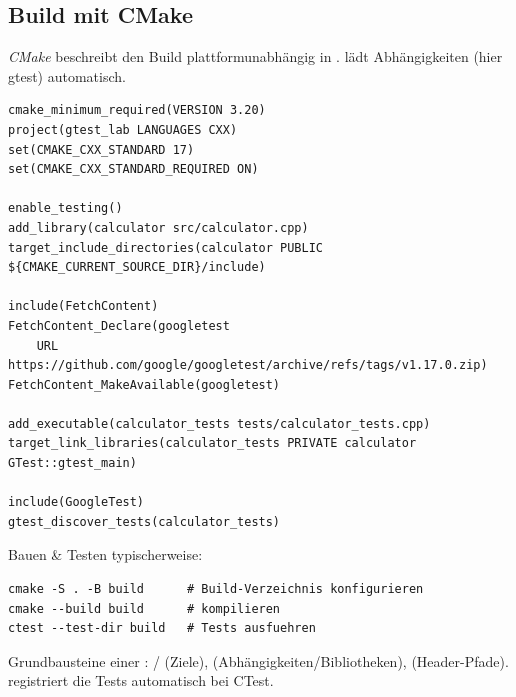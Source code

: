 \subsection{Build mit CMake}
\emph{CMake} beschreibt den Build plattformunabh\"angig in .  l\"adt Abh\"angigkeiten (hier gtest) automatisch.
\begin{lstlisting}[language={},morekeywords={}]
cmake_minimum_required(VERSION 3.20)
project(gtest_lab LANGUAGES CXX)
set(CMAKE_CXX_STANDARD 17)
set(CMAKE_CXX_STANDARD_REQUIRED ON)

enable_testing()
add_library(calculator src/calculator.cpp)
target_include_directories(calculator PUBLIC ${CMAKE_CURRENT_SOURCE_DIR}/include)

include(FetchContent)
FetchContent_Declare(googletest
    URL https://github.com/google/googletest/archive/refs/tags/v1.17.0.zip)
FetchContent_MakeAvailable(googletest)

add_executable(calculator_tests tests/calculator_tests.cpp)
target_link_libraries(calculator_tests PRIVATE calculator GTest::gtest_main)

include(GoogleTest)
gtest_discover_tests(calculator_tests)
\end{lstlisting}
Bauen \& Testen typischerweise:
\begin{lstlisting}[language={}]
cmake -S . -B build      # Build-Verzeichnis konfigurieren
cmake --build build      # kompilieren
ctest --test-dir build   # Tests ausfuehren
\end{lstlisting}
\begin{merke}
Grundbausteine einer :  /  (Ziele),  (Abh\"angigkeiten/Bibliotheken),  (Header-Pfade).  registriert die Tests automatisch bei CTest.
\end{merke}
\clearpage
